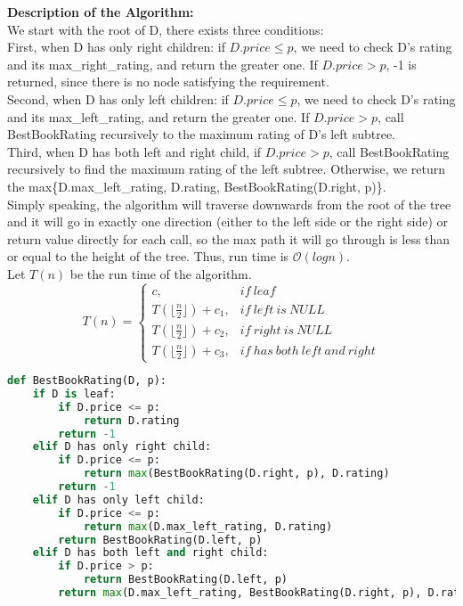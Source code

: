 \documentclass[10pt]{article}
\begin{document}
\begin{enumerate}
\textbf{Description of the Algorithm:}\\
We start with the root of D, there exists three conditions:\\
First, when D has only right children: if $D.price \leq p$, we need to check  D's rating and its max\_right\_rating, and return the greater one. If $D.price > p$, -1 is returned, since there is no node satisfying the requirement.\\
Second, when D has only left children: if $D.price \leq p$, we need to check  D's rating and its max\_left\_rating, and return the greater one. If $D.price > p$, call BestBookRating recursively to the maximum rating of D's left subtree.\\
Third, when D has both left and right child, if $D.price > p$, call BestBookRating recursively to find the maximum rating of the left subtree. Otherwise, we return the max\{D.max\_left\_rating, D.rating, BestBookRating(D.right, p)\}.\\
Simply speaking, the algorithm will traverse downwards from the root of the tree and it will go in exactly one direction (either to the left side or the right side) or return value directly for each call, so the max path it will go through is less than or equal to the height of the tree. Thus, run time is $\mathcal{O}(logn)$.\\
Let $T(n)$ be the run time of the algorithm.
\begin{equation*}
  T(n)=\begin{cases}
    c, &if\ leaf\\
    T( \lfloor\frac{n}{2}\rfloor) + c_1, &if\ left\ is\ NULL\\
    T(\lfloor\frac{n}{2}\rfloor) + c_2, &if\ right\ is\ NULL\\
    T(\lfloor\frac{n}{2}\rfloor) + c_3, &if\ has\ both\ left\ and\ right
  \end{cases}
\end{equation*}

\begin{lstlisting}[language=Python]
def BestBookRating(D, p):
	if D is leaf:
		if D.price <= p:
			return D.rating
		return -1
	elif D has only right child:
		if D.price <= p:
			return max(BestBookRating(D.right, p), D.rating)
		return -1
	elif D has only left child:
		if D.price <= p:
			return max(D.max_left_rating, D.rating)
		return BestBookRating(D.left, p)
	elif D has both left and right child:
		if D.price > p:
			return BestBookRating(D.left, p)
		return max(D.max_left_rating, BestBookRating(D.right, p), D.rating)
\end{lstlisting}



\end{enumerate}
\end{document}
